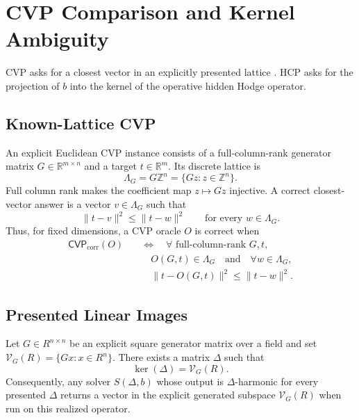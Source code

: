 \section{CVP Comparison and Kernel Ambiguity}\label{sec:cvp-comparison}

CVP asks for a closest vector in an explicitly presented lattice
\cite{micciancioGoldwasser2002}. HCP asks for
the projection of \(b\) into the kernel of the operative hidden Hodge operator.

\subsection{Known-Lattice CVP}\label{sec:known-lattice-cvp}

An explicit Euclidean CVP instance consists of a full-column-rank generator
matrix \(G\in\mathbb R^{m\times n}\) and a target \(t\in\mathbb R^m\). Its
discrete lattice is
\[
  \Lambda_G=G\mathbb Z^n=\{Gz:z\in\mathbb Z^n\}.
\]
Full column rank makes the coefficient map \(z\mapsto Gz\) injective.
A correct closest-vector answer is a vector \(v\in\Lambda_G\) such that
\[
  \|t-v\|^2\le \|t-w\|^2
  \qquad
  \text{for every }w\in\Lambda_G.
\]
Thus, for fixed dimensions, a CVP oracle \(O\) is correct when
\[
\begin{aligned}
  \mathsf{CVP}_{\mathrm{corr}}(O)
  &\quad\Longleftrightarrow\quad
  \forall\text{ full-column-rank }G,t,\\
  &\qquad O(G,t)\in\Lambda_G
  \quad\text{and}\quad
  \forall w\in\Lambda_G,\\
  &\qquad \|t-O(G,t)\|^2\le \|t-w\|^2.
\end{aligned}
\]
\subsection{Presented Linear Images}

\begin{proposition}\label{prop:hcp-to-cvp}
  Let \(G\in R^{n\times n}\) be an explicit square generator matrix over a
  field and set
  \(\mathcal V_G(R)=\{Gx:x\in R^n\}\). There exists a matrix \(\Delta\) such that
  \[
    \ker(\Delta)=\mathcal V_G(R) .
  \]
  Consequently, any solver \(S(\Delta,b)\) whose output is
  \(\Delta\)-harmonic for every
  presented \(\Delta\) returns a vector in the explicit generated subspace
  \(\mathcal V_G(R)\) when run on this realized operator.
\end{proposition}

